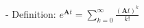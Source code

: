 \documentclass[preview]{standalone}
\begin{document}
\begin{center}
- Definition: $e^{\mathbf{A}t} = \sum_{k=0}^{\infty} \frac{(\mathbf{A}t)^k}{k!}$
\end{center}
\end{document}

